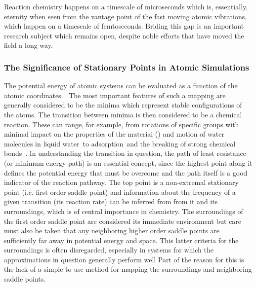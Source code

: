 Reaction chemistry happens on a timescale of microseconds which is, essentially, eternity when seen from the vantage point of the fast moving atomic vibrations, which happen on a timescale of femtoseconds.
Briding this gap is an important research subject which remains open, despite noble efforts that have moved the field a long way\citemiss.


\subsubsection{The Significance of Stationary Points in Atomic Simulations}
The potential energy of atomic systems can be evaluated as a function of the atomic coordinates.~\cite{born-oppenheimer-1927, schrodinger-equation-1926, kohn-1999}
The most important features of such a mapping are generally considered to be the minima which represent stable configurations of the atoms.
The transition between minima is then considered to be a chemical reaction.
These can range, for example, from rotations of specific groups with minimal impact on the properties of the material () and motion of water molecules in liquid water~\citemiss to adsorption~\citemiss and the breaking of strong chemical bonds~\citemiss.
In understanding the transition in question, the path of least resistance (or minimum energy path) is an essential concept, since the highest point along it defines the potential energy that must be overcome and the path itself is a good indicator of the reaction pathway.
The top point is a non-extremal stationary point (i.c. first order saddle point) and information about the frequency of a given transition (its reaction rate) can be inferred from from it and its surroundings, which is of central importance in chemistry.\cite{htst-wert-1949, htst-vineyard-1957}
The surroundings of the first order saddle point are considered its immediate environment but care must also be taken that any neighboring higher order saddle points are sufficiently far away in potential energy and space.
This latter criteria for the surroundings is often disregarded, especially in systems for which the approximations in question generally perform well
Part of the reason for this is the lack of a simple to use method for mapping the surroundings and neighboring saddle points.


